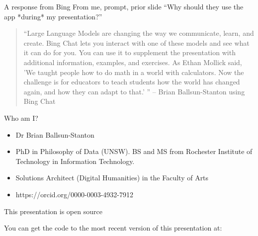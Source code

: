 \documentclass[aspectratio=169]{beamer}
\newcommand{\clearbackground}[0]{\setbeamertemplate{background}{}}
\newcommand{\setbackground}[2]{
  \setbeamertemplate{background}{
    \begin{tikzpicture}[remember picture,overlay]
      \node[anchor=north west,inner sep=0pt] at ([xshift=0.5cm,yshift=1cm]current page.north west) {\texttt{[image: \#1]}};
      \fill[mask,opacity=#2] (current page.south west) rectangle (current page.north east); %
    \end{tikzpicture}
  }
}
\newcommand{\slidetemplate}[6]{
  \ifblank{#1}{}{
  \setbackground{#1}{#2} %
  }
  \begin{frame}[plain]
    \begin{minipage}[t][.9\textheight][t]    
    {.7\textwidth}      
      \frametitle{\hspace{0.75em}#3}
      \vspace{1mm}
      #4 %
    \end{minipage}    
    \ifblank{#5}{
    }{ %
    \hspace{.01\textwidth}
    \makebox[0pt][l]{\noindent\begin{minipage}[t][.8\textheight][t]{.3\textwidth}
      \raggedleft
      \vspace*{.01\textheight}
      {\tiny #5\\[1em] %
      \vfill      
      \colorbox{white}{\qrcode[height=0.5in]{#6}}\\ %
      \url{#6}} %
    \end{minipage}}}
  \end{frame}
}
\begin{document}
\clearbackground{}

\begin{frame}{A response from Bing}
From me, prompt, prior slide ``Why should they use the app *during* my presentation?''

\begin{quote}
“Large Language Models are changing the way we communicate, learn, and create. Bing Chat lets you interact with one of these models and see what it can do for you. You can use it to supplement the presentation with additional information, examples, and exercises. As Ethan Mollick said, 'We taught people how to do math in a world with calculators. Now the challenge is for educators to teach students how the world has changed again, and how they can adapt to that.' \parencite{Wood2023-zf}” -- Brian Ballsun-Stanton using Bing Chat
\end{quote}    
\end{frame}

\begin{frame}{Who am I?}

\begin{itemize}
    \item Dr Brian Ballsun-Stanton
    \item PhD in Philosophy of Data (UNSW). BS and MS from Rochester Institute of Technology in Information Technology.
    \item Solutions Architect (Digital Humanities) in the Faculty of Arts
    \item https://orcid.org/0000-0003-4932-7912 
\end{itemize}

\end{frame}

\begin{frame}{This presentation is open source}

You can get the code to the most recent version of this presentation at: 
    
\end{frame}





\end{document}
